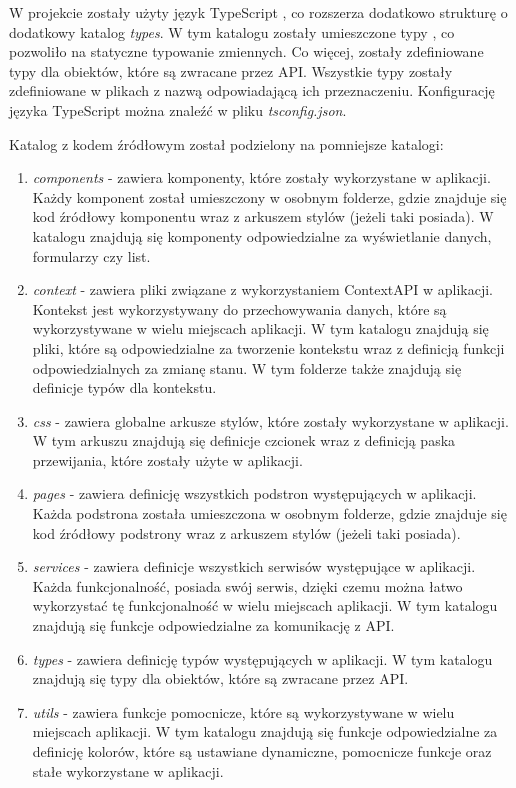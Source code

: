 W projekcie zostały użyty język TypeScript \cite{TypeScript}, co rozszerza dodatkowo strukturę o dodatkowy katalog \textit{types}. W tym katalogu zostały umieszczone typy \cite{TypeScript_types}, co pozwoliło na statyczne typowanie zmiennych. Co więcej, zostały zdefiniowane typy dla obiektów, które są zwracane przez API. Wszystkie typy zostały zdefiniowane w plikach z nazwą odpowiadającą ich przeznaczeniu. Konfigurację języka TypeScript można znaleźć w pliku \textit{tsconfig.json}.

Katalog z kodem źródłowym został podzielony na pomniejsze katalogi:
\begin{enumerate}
    \item \textit{components} - zawiera komponenty, które zostały wykorzystane w aplikacji. Każdy komponent został umieszczony w osobnym folderze, gdzie znajduje się kod źródłowy komponentu wraz z arkuszem stylów (jeżeli taki posiada). W katalogu znajdują się komponenty odpowiedzialne za wyświetlanie danych, formularzy czy list.
    \item \textit{context} - zawiera pliki związane z wykorzystaniem ContextAPI \cite{React_context} w aplikacji. Kontekst jest wykorzystywany do przechowywania danych, które są wykorzystywane w wielu miejscach aplikacji. W tym katalogu znajdują się pliki, które są odpowiedzialne za tworzenie kontekstu wraz z definicją funkcji odpowiedzialnych za zmianę stanu. W tym folderze także znajdują się definicje typów dla kontekstu.
    \item \textit{css} - zawiera globalne arkusze stylów, które zostały wykorzystane w aplikacji. W tym arkuszu znajdują się definicje czcionek wraz z definicją paska przewijania, które zostały użyte w aplikacji.
    \item \textit{pages} - zawiera definicję wszystkich podstron występujących w aplikacji. Każda podstrona została umieszczona w osobnym folderze, gdzie znajduje się kod źródłowy podstrony wraz z arkuszem stylów (jeżeli taki posiada).
    \item \textit{services} - zawiera definicje wszystkich serwisów występujące w aplikacji. Każda funkcjonalność, posiada swój serwis, dzięki czemu można łatwo wykorzystać tę funkcjonalność w wielu miejscach aplikacji. W tym katalogu znajdują się funkcje odpowiedzialne za komunikację z API.
    \item \textit{types} - zawiera definicję typów występujących w aplikacji. W tym katalogu znajdują się typy dla obiektów, które są zwracane przez API.
    \item \textit{utils} - zawiera funkcje pomocnicze, które są wykorzystywane w wielu miejscach aplikacji. W tym katalogu znajdują się funkcje odpowiedzialne za definicję kolorów, które są ustawiane dynamiczne, pomocnicze funkcje oraz stałe wykorzystane w aplikacji.
\end{enumerate}

